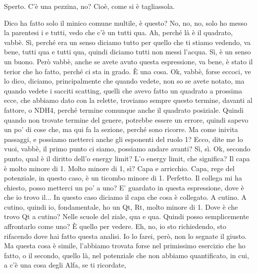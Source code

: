 \begin{soluzione}
Sperto. C'è una pezzina, no? Cioè, come si è tagliassola. 
   
   
   Dico ha fatto solo il minico comune multile, è questo? No, no, no, solo ho messo la parentesi i e tutti, vedo che c'è un tutti qua. Ah, perché là è il quadrato, vabbè. Sì, perché era un senso diciamo tutto per quello che ti stiamo vedendo, va bene, tutti qua e tutti qua, quindi diciamo tutti non messi l'acqua. Sì, è un senso un buono. Però vabbè, anche se avete avuto questa espressione, va bene, è stato il terior che ho fatto, perché ci sta in grado. È una cosa. Ok, vabbè, forse eccoci, ve lo dico, diciamo, principalmente che quando vedete, non so se avete notato, ma quando vedete i sacciti scatting, quelli che avevo fatto un quadrato a prossima ecce, che abbiamo dato con la relette, troviamo sempre questo termine, davanti al fattore, o NDH4, perché termine comunque anche il quadrato posiziale. Quindi quando non trovate termine del genere, potrebbe essere un errore, quindi sapevo un po' di cose che, ma qui fa la sezione, perché sono ricorre. Ma come inivita passaggi, e possiamo metterci anche gli esponenti del ruolo 1? Ecco, dite me lo vuoi, vabbè, il primo punto ci siamo, possiamo andare avanti? Sì, sì. Ok, secondo punto, qual è il diritto dell'o energy limit? L'o energy limit, che significa? Il capa è molto minore di 1. Molto minore di 1, sì? Capa e arricchio. Capa, rege del potenziale, in questo caso, è un ticombo minore di 1. Perfetto. Il collega mi ha chiesto, posso metterci un po' a uno? E' guardato in questa espressione, dove è che io trovo il... In questo caso diciamo il capa che cosa è collegato. A cutino. A cutino, quindi io, fondamentale, ho un Qt, Rt, molto minore di 1. Dove è che trovo Qt a cutino? Nelle scuole del ziale, qua e qua. Quindi posso semplicemente affrontarlo come uno? È quello per vedere. Eh, no, io sto richiedendo, sto rifacendo dove hai fatto questa analisi. Io lo farei, però, non lo segnate il giusto. Ma questa cosa è simile, l'abbiamo trovata forse nel primissimo esercizio che ho fatto, o il secondo, quello là, nel potenziale che non abbiamo quantificato, in cui, a c'è una cosa degli Alfa, se ti ricordate, 
   

\end{soluzione}
